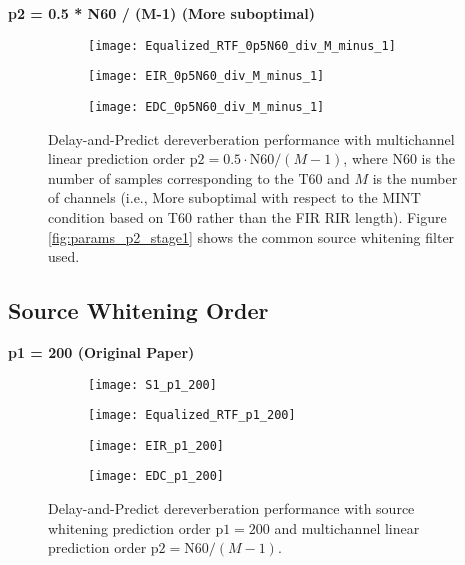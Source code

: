 \textbf{p2 = 0.5 * N60 / (M-1) (More suboptimal)}

\begin{figure}[H]
	\centering
	\begin{subfigure}[b]{0.32\textwidth}
		\centering
		\texttt{[image: Equalized\_RTF\_0p5N60\_div\_M\_minus\_1]}
	\end{subfigure}
	\hfill
	\begin{subfigure}[b]{0.32\textwidth}
		\centering
		\texttt{[image: EIR\_0p5N60\_div\_M\_minus\_1]}
	\end{subfigure}
	\hfill
	\begin{subfigure}[b]{0.32\textwidth}
		\centering
		\texttt{[image: EDC\_0p5N60\_div\_M\_minus\_1]}
	\end{subfigure}
	\hfill
	\caption{Delay-and-Predict dereverberation performance with multichannel linear prediction order $\mathrm{p2} = 0.5 \cdot \mathrm{N60} / (M-1)$, where N60 is the number of samples corresponding to the T60 and $M$ is the number of channels (i.e., More suboptimal with respect to the MINT condition based on T60 rather than the FIR RIR length). Figure \ref{fig:params_p2_stage1} shows the common source whitening filter used.}
	\label{fig:params_p2_0p5_N60}
\end{figure}

\subsection{Source Whitening Order} \label{section:appendix:params_p1}

\textbf{p1 = 200 (Original Paper)}

\begin{figure}[H]
	\centering
	\begin{subfigure}[b]{0.49\textwidth}
		\centering
		\texttt{[image: S1\_p1\_200]}
	\end{subfigure}
	\hfill
	\begin{subfigure}[b]{0.49\textwidth}
		\centering
		\texttt{[image: Equalized\_RTF\_p1\_200]}
	\end{subfigure}
	\hfill
	\begin{subfigure}[b]{0.49\textwidth}
		\centering
		\texttt{[image: EIR\_p1\_200]}
	\end{subfigure}
	\hfill
	\begin{subfigure}[b]{0.49\textwidth}
		\centering
		\texttt{[image: EDC\_p1\_200]}
	\end{subfigure}
	\hfill
	\caption{Delay-and-Predict dereverberation performance with source whitening prediction order $\mathrm{p1} = 200$ and multichannel linear prediction order $\mathrm{p2} = \mathrm{N60}  / (M-1)$.}
	\label{fig:params_p1_200}
\end{figure}

